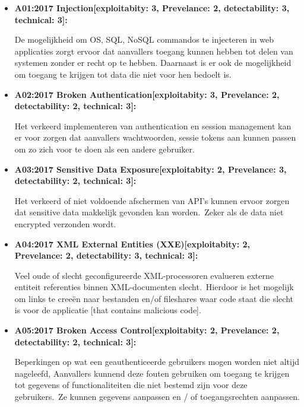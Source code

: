 \begin{itemize}

    \item \textbf{A01:2017 Injection[exploitabity: 3, Prevelance: 2, detectability: 3, technical: 3]:}

    De mogelijkheid om OS, SQL, NoSQL commandos te injecteren in web applicaties zorgt ervoor dat aanvallers toegang kunnen hebben tot delen van systemen zonder er recht op te hebben.
    Daarnaast is er ook de mogelijkheid om toegang te krijgen tot data die niet voor hen bedoelt is.


    \item \textbf{A02:2017 Broken Authentication[exploitabity: 3, Prevelance: 2, detectability: 2, technical: 3]:}

    Het verkeerd implementeren van authentication en session management kan er voor zorgen dat aanvallers wachtwoorden, sessie tokens aan kunnen passen om zo zich voor te doen als een andere gebruiker.

    \item \textbf{A03:2017 Sensitive Data Exposure[exploitabity: 2, Prevelance: 3, detectability: 2, technical: 3]:}

    Het verkeerd of niet voldoende afschermen van API's kunnen ervoor zorgen dat sensitive data makkelijk gevonden kan worden.\ Zeker als de data niet encrypted verzonden wordt.

    \item \textbf{A04:2017 XML External Entities (XXE)[exploitabity: 2, Prevelance: 2, detectability: 3, technical: 3]:}

    Veel oude of slecht geconfigureerde XML-processoren evalueren externe entiteit referenties binnen XML-documenten slecht.\ Hierdoor is het mogelijk om links te creeën naar bestanden en/of fileshares waar code staat die slecht is voor de applicatie [that contains malicious code].

    \item \textbf{A05:2017 Broken Access Control[exploitabity: 2, Prevelance: 2, detectability: 2, technical: 3]:}

    Beperkingen op wat een geauthenticeerde gebruikers mogen worden niet altijd nageleefd, Aanvallers kunnend deze fouten gebruiken om toegang te krijgen tot gegevens of functionaliteiten die niet bestemd zijn voor deze gebruikers.\ Ze kunnen gegevens aanpassen en / of toegangsrechten aanpassen.


\end{itemize}
